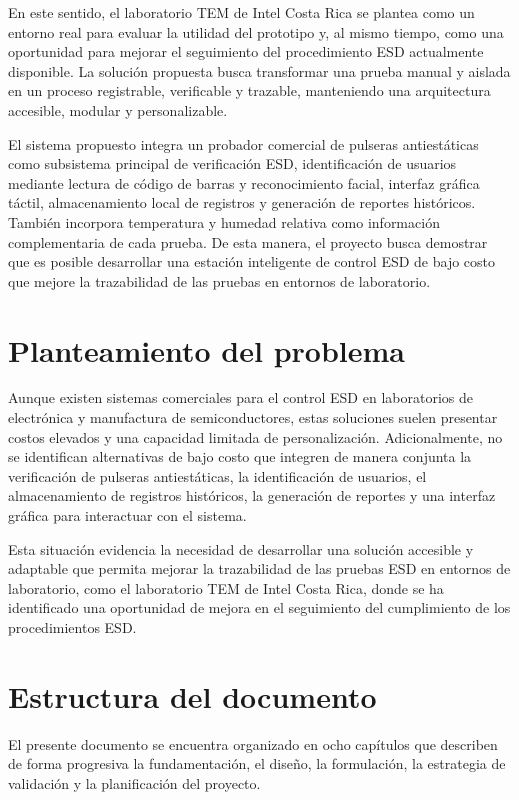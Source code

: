 En este sentido, el laboratorio TEM de Intel Costa Rica se plantea como un entorno real
para evaluar la utilidad del prototipo y, al mismo tiempo, como una oportunidad para
mejorar el seguimiento del procedimiento ESD actualmente disponible. La solución
propuesta busca transformar una prueba manual y aislada en un proceso registrable,
verificable y trazable, manteniendo una arquitectura accesible, modular y personalizable.

El sistema propuesto integra un probador comercial de pulseras antiestáticas como
subsistema principal de verificación ESD, identificación de usuarios mediante lectura de
código de barras y reconocimiento facial, interfaz gráfica táctil, almacenamiento local de
registros y generación de reportes históricos. También incorpora temperatura y humedad
relativa como información complementaria de cada prueba.
De esta manera, el proyecto busca demostrar que es posible desarrollar una estación
inteligente de control ESD de bajo costo que mejore la trazabilidad de las pruebas en
entornos de laboratorio.

\section{Planteamiento del problema}

Aunque existen sistemas comerciales para el control ESD en laboratorios de electrónica y
manufactura de semiconductores, estas soluciones suelen presentar costos elevados y una
capacidad limitada de personalización. Adicionalmente, no se identifican alternativas de
bajo costo que integren de manera conjunta la verificación de pulseras antiestáticas, la
identificación de usuarios, el almacenamiento de registros históricos, la generación de
reportes y una interfaz gráfica para interactuar con el sistema.

Esta situación evidencia la necesidad de desarrollar una solución accesible y adaptable que
permita mejorar la trazabilidad de las pruebas ESD en entornos de laboratorio, como el
laboratorio TEM de Intel Costa Rica, donde se ha identificado una oportunidad de mejora
en el seguimiento del cumplimiento de los procedimientos ESD.

\section{Estructura del documento}

El presente documento se encuentra organizado en ocho capítulos que describen de forma
progresiva la fundamentación, el diseño, la formulación, la estrategia de validación y la
planificación del proyecto.

